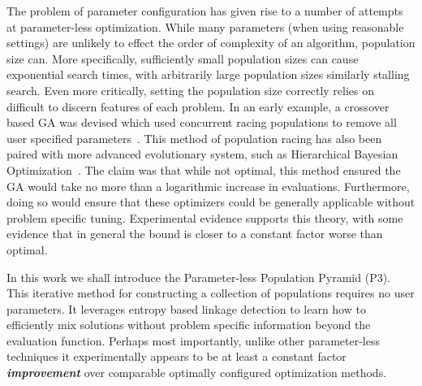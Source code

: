 \documentclass{sig-alternate}
\begin{document}
The problem of parameter configuration has given rise to a number of attempts at
parameter-less optimization.  While many parameters (when using reasonable settings) are unlikely to effect the order
of complexity of an algorithm, population size can.  More specifically, sufficiently small
population sizes can cause exponential search times, with arbitrarily large population sizes
similarly stalling search.  Even more critically, setting the population size correctly relies
on difficult to discern features of each problem. In an early example, a crossover based GA was devised
which used concurrent racing populations to remove all user specified parameters~\cite{harik:1999:parameterlessga}.
This method of population racing has also been paired with more advanced evolutionary system,
such as Hierarchical Bayesian Optimization~\cite{pelikan:2004:parameterlesshboa}. The claim was that while not optimal,
this method ensured the GA would take no more than a logarithmic increase in evaluations.
Furthermore, doing so would ensure that these optimizers could be generally applicable
without problem specific tuning.  Experimental evidence supports this theory,
with some evidence that in general the bound is closer to a constant factor worse
than optimal.

In this work we shall introduce the Parameter-less Population Pyramid (P3).  This iterative
method for constructing a collection of populations requires no user parameters.
It leverages entropy based linkage detection to learn how to efficiently mix
solutions without problem specific information beyond the evaluation function.  Perhaps
most importantly, unlike other parameter-less techniques it experimentally appears to be at least
a constant factor \emph{\textbf{improvement}} over comparable optimally configured
optimization methods.
\end{document}
